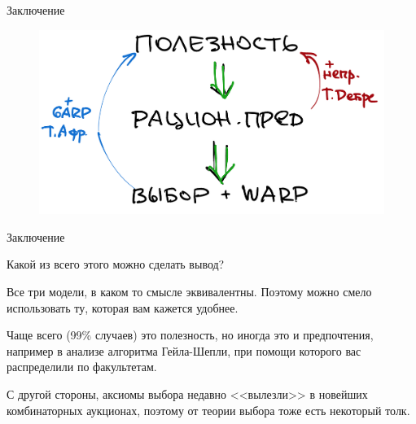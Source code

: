 \documentclass{beamer}
\begin{document}
\begin{frame}{Заключение}

\begin{figure}[hbt]
\centering
\includegraphics[width=1 \textwidth]{arch.png}
\end{figure}

\end{frame}

\begin{frame}{Заключение}

Какой из всего этого можно сделать вывод?

Все три модели, в каком то смысле эквивалентны. Поэтому можно смело использовать ту, которая вам кажется удобнее. 

Чаще всего (99\% случаев) это полезность, но иногда это и предпочтения, например в анализе алгоритма Гейла-Шепли, при помощи которого вас распределили по факультетам. 

С другой стороны, аксиомы выбора недавно <<вылезли>> в новейших комбинаторных аукционах, поэтому от теории выбора тоже есть некоторый толк.

\end{frame}
\end{document}
